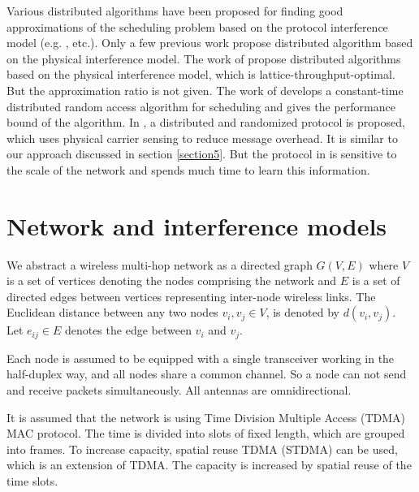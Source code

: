 \documentclass[conference]{IEEEtran}
\begin{document}
Various distributed algorithms have been proposed for finding good
approximations of the scheduling problem based on the protocol
interference model (e.g.
\cite{chaporkar2005throughput,lin2005impact,modiano2006maximizing },
etc.). Only a few previous work propose distributed algorithm based
on the physical interference model. The work of
\cite{yi2007optimal,yi-mac,yi2006learning} propose distributed
algorithms based on the physical interference model, which is
lattice-throughput-optimal. But the approximation ratio is not
given. The work of \cite{joo2007performance} develops a
constant-time distributed random access algorithm for scheduling and
gives the performance bound of the algorithm. In
\cite{scheideler2008log}, a distributed and randomized protocol is
proposed, which uses physical carrier sensing to reduce message
overhead. It is similar to our approach discussed in section
\ref{section5}. But the protocol in \cite{scheideler2008log} is
sensitive to the scale of the network and spends much time to learn
this information.

\section{Network and interference models}\label{section3}
We abstract a wireless multi-hop network as a directed graph
$G(V,E)$ where $V$ is a set of vertices denoting the nodes
comprising the network and $E$ is a set of directed edges between
vertices representing inter-node wireless links. The Euclidean
distance between any two nodes $v_{i},v_{j}\in V$, is denoted by
$d(v_{i},v_{j})$. Let $e_{ij}\in E $ denotes the edge between $v_i$
and $v_j$.

Each node is assumed to be equipped with a single transceiver
working in the half-duplex way, and all nodes share a common
channel. So a node can not send and receive packets simultaneously.
All antennas  are omnidirectional.

It is assumed that the network is using Time Division Multiple
Access (TDMA) MAC protocol. The time is divided into slots of fixed
length, which are grouped into frames. To increase capacity, spatial
reuse TDMA (STDMA) \cite{nelson1985stc} can be used, which is an
extension of TDMA. The capacity is increased by spatial reuse of the
time slots.
\end{document}
